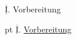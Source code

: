 \documentclass[12pt,a4paper]{article}
\newcommand{\rom}[1]{$\underline{\overline{\text{#1}}}$}
\begin{document}
\rom{I}. Vorbereitung

 pt
\rom{I}. { \setul{.65ex}{2pt} \ul{Vorbereitung}}
\end{document}
